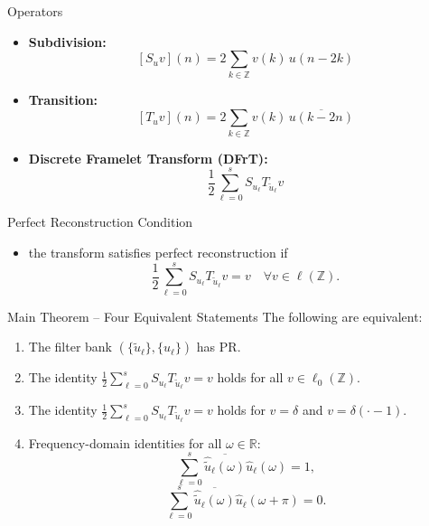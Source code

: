 \documentclass{beamer}
\begin{document}
\begin{frame}{Operators}
    \begin{itemize}
        \item \textbf{Subdivision:}
              \[
                  [S_u v](n)=2\sum_{k\in\mathbb{Z}} v(k)\,u(n-2k)
              \]
        \item \textbf{Transition:}
              \[
                  [T_u v](n)=2\sum_{k\in\mathbb{Z}} v(k)\,\overline{u(k-2n)}
              \]
        \item \textbf{Discrete Framelet Transform (DFrT):}
              \[
                  \frac12\sum_{\ell=0}^{s} S_{u_\ell}T_{\tilde u_\ell}v
              \]
    \end{itemize}
\end{frame}


\begin{frame}{Perfect Reconstruction Condition}
    \begin{itemize}
        \item the transform satisfies perfect reconstruction if
              \[
                  \frac{1}{2}\sum_{\ell=0}^s S_{u_\ell} T_{\tilde{u}_\ell} v = v \quad \forall v\in\ell(\mathbb{Z}).
              \]
    \end{itemize}
\end{frame}


\begin{frame}{Main Theorem -- Four Equivalent Statements}
    The following are equivalent:

    \begin{enumerate}
        \item The filter bank $(\{\tilde u_\ell\},\{u_\ell\})$ has PR.
        \item The identity $\displaystyle\frac12\sum_{\ell=0}^{s} S_{u_\ell}T_{\tilde u_\ell}v = v$ holds for all $v\in\ell_0(\mathbb{Z})$.
        \item The identity $\displaystyle\frac12\sum_{\ell=0}^{s} S_{u_\ell}T_{\tilde u_\ell}v = v$ holds for $v=\delta$ and $v=\delta(\cdot-1)$.
        \item Frequency-domain identities for all $\omega\in\mathbb{R}$:
              \[
                  \sum_{\ell=0}^{s}\overline{\hat{\tilde u}_\ell(\omega)}\hat u_\ell(\omega)=1,
              \]
              \[
                  \sum_{\ell=0}^{s}\overline{\hat{\tilde u}_\ell(\omega)}\hat u_\ell(\omega+\pi)=0.
              \]
    \end{enumerate}
\end{frame}
\end{document}

